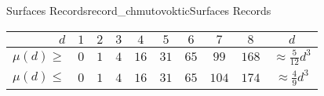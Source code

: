 \begin{surferIntroPage}{Surfaces Records}{record_chmutovoktic}{Surfaces Records}
   \begin{center}
      \begin{tabular}{r|cccccccc|c}
        $d$ & $1$ & $2$ & $3$ & $4$ & $5$ & $6$ & $7$ & $8$ & $d$\\
        \hline
        \hline
        \rule{0pt}{1.2em}$\mu(d)\ge$ & $0$ & $1$ & $4$ & $16$ & $31$ & $65$ &
        $99$ & $168$ & 
        $\approx \frac{5}{12}d^3$\\[0.3em]
        \hline
        \rule{0pt}{1.2em}$\mu(d)\le$ & $0$ & $1$ & $4$ & $16$ & $31$ & $65$ &
        $104$ & $174$ & $\approx \frac{4}{9}d^3$
      \end{tabular}
    \end{center}
\end{surferIntroPage}
